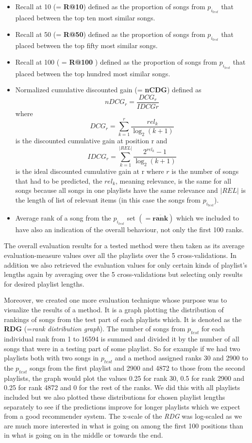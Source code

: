 \begin{itemize}
    \item Recall at 10 (= \textbf{R@10}) defined as the proportion of songs from $p_{i_{test}} $ that placed between the top ten most similar songs.
    \item Recall at 50 (= \textbf{R@50}) defined as the proportion of songs from $p_{i_{test}} $ that placed between the top fifty most similar songs.
    \item Recall at 100 ( = \textbf{R@100} ) defined as the proportion of songs from $p_{i_{test}} $ that placed between the top hundred most similar songs.
    \item Normalized cumulative discounted gain (= \textbf{nCDG}) defined as 
    $${nDCG_{r}} = \frac{DCG_{r}}{IDCG{r}} $$
    where 
    $${DCG_{r}} =\sum_{k=1}^{r}{\frac {rel_{k}}{\log _{2}(k+1)}} $$ 
    is the discounted cumulative gain at position r and 
    $$ {IDCG_{r}} =\sum _{k=1}^{|REL|}{\frac {2^{rel_{k}}-1}{\log _{2}(k+1)}} $$
    is the ideal discounted cumulative gain at r
    where $r$ is the number of songs that had to be predicted, the $rel_k$, meaning relevance, is the same for all songs because all songs in one playlists have the same relevance and $|REL|$ is the length of list of relevant items (in this case the songs from $p_{i_{test}}$).
    \item Average rank of a song from the $p_{i_{test}}$ set $ \boldsymbol{ (= \overline{rank})} $ which we included to have also an indication of the overall behaviour, not only the first 100 ranks.

\end{itemize}

The overall evaluation results for a tested method were then taken as its 
average evaluation-measure values over all the playlists over the 5 
cross-validations. In addition we also retrieved the evaluation values for only certain kinds of playlist's lengths again by averaging over the 5 cross-validations but selecting only results for desired playlist lengths.

Moreover, we created one more evaluation technique whose purpose was to visualize the results of a method. It is a graph plotting the distribution of rankings of songs from the test part of each playlists which. It is denoted as the \textbf{RDG} (=\textit{rank distribution graph}). The number of songs from $p_{test}$ for each individual rank from 1 to 16594 is summed and divided it by the number of all songs that were in a testing part of some playlist. So for example if we had two playlists both with two songs in $p_{test}$ and a method assigned ranks 30 and 2900 to the $p_{test}$ songs from the first playlist and 2900 and 4872 to those from the second playlists, the graph would plot the values 0.25 for rank 30, 0.5 for rank 2900 and 0.25 for rank 4872 and 0 for the rest of the ranks. We did this with all playlists included but we also plotted these distributions for chosen playlist lengths separately to see if the predictions improve for longer playlists which we expect from a good recommender system. The x-scale of the \textit{RDG} was log-scaled as we are much more interested in what is going on among the first 100 positions than in what is going on in the middle or towards the end. 
    
